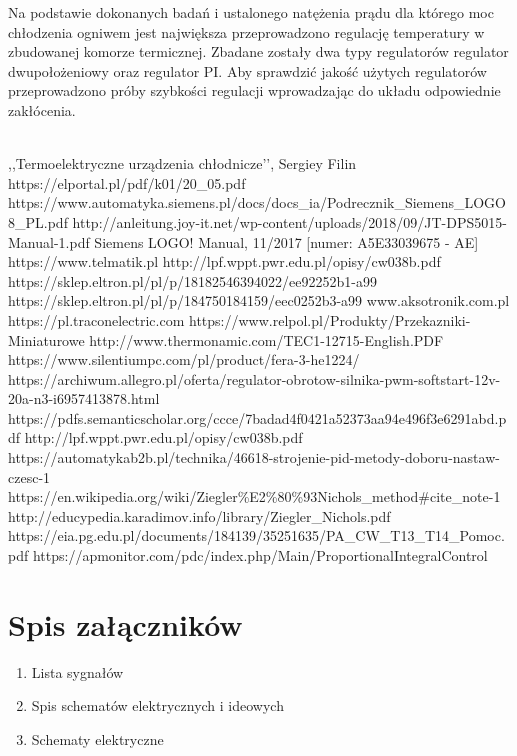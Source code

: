 \documentclass[oneside]{mgr}
\begin{document}
Na podstawie dokonanych badań i ustalonego natężenia prądu dla którego moc chłodzenia ogniwem jest największa przeprowadzono regulację temperatury w zbudowanej komorze termicznej. Zbadane zostały dwa typy regulatorów regulator dwupołożeniowy oraz regulator PI. Aby sprawdzić jakość użytych regulatorów przeprowadzono próby szybkości regulacji wprowadzając do układu odpowiednie zakłócenia.


\begin{thebibliography} 
\\
,,Termoelektryczne urządzenia chłodnicze’’, Sergiey Filin
https://elportal.pl/pdf/k01/20\_05.pdf
https://www.automatyka.siemens.pl/docs/docs\_ia/Podrecznik\_Siemens\_LOGO8\_PL.pdf
http://anleitung.joy-it.net/wp-content/uploads/2018/09/JT-DPS5015-Manual-1.pdf
Siemens LOGO! Manual, 11/2017 [numer: A5E33039675 - AE]
https://www.telmatik.pl
http://lpf.wppt.pwr.edu.pl/opisy/cw038b.pdf
https://sklep.eltron.pl/pl/p/18182546394022/ee92252b1-a99
https://sklep.eltron.pl/pl/p/184750184159/eec0252b3-a99
www.aksotronik.com.pl
https://pl.traconelectric.com
https://www.relpol.pl/Produkty/Przekazniki-Miniaturowe
http://www.thermonamic.com/TEC1-12715-English.PDF
https://www.silentiumpc.com/pl/product/fera-3-he1224/
https://archiwum.allegro.pl/oferta/regulator-obrotow-silnika-pwm-softstart-12v-20a-n3-i6957413878.html
https://pdfs.semanticscholar.org/ccce/7badad4f0421a52373aa94e496f3e6291abd.pdf
http://lpf.wppt.pwr.edu.pl/opisy/cw038b.pdf
https://automatykab2b.pl/technika/46618-strojenie-pid-metody-doboru-nastaw-czesc-1
https://en.wikipedia.org/wiki/Ziegler\%E2\%80\%93Nichols\_method\#cite\_note-1
http://educypedia.karadimov.info/library/Ziegler\_Nichols.pdf
https://eia.pg.edu.pl/documents/184139/35251635/PA\_CW\_T13\_T14\_Pomoc.pdf
https://apmonitor.com/pdc/index.php/Main/ProportionalIntegralControl
\end{thebibliography}

\listoffigures
{}
\listoftables
{}
\chapter*{Spis załączników}
\begin{enumerate}
    \item Lista sygnałów
    \item Spis schematów elektrycznych i ideowych
    \item Schematy elektryczne
\end{enumerate}
\end{document}
